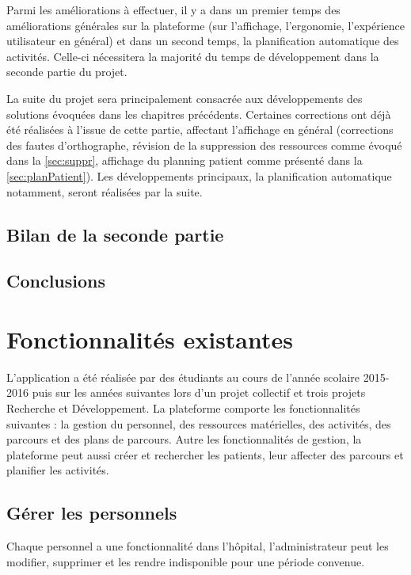 \documentclass[noposter]{polytech/polytech}
\begin{document}
Parmi les améliorations à effectuer, il y a dans un premier temps des améliorations générales sur la plateforme (sur l'affichage, l'ergonomie, l'expérience utilisateur en général) et dans un second temps, la planification automatique des activités. Celle-ci nécessitera la majorité du temps de développement dans la seconde partie du projet.

La suite du projet sera principalement consacrée aux développements des solutions évoquées dans les chapitres précédents. Certaines corrections ont déjà été réalisées à l'issue de cette partie, affectant l'affichage en général (corrections des fautes d'orthographe, révision de la suppression des ressources comme évoqué dans la \autoref{sec:suppr}, affichage du planning patient comme présenté dans la \autoref{sec:planPatient}). Les développements principaux, la planification automatique notamment, seront réalisées par la suite. 

\section*{Bilan de la seconde partie}


\section*{Conclusions}



\appendix

\chapter{Fonctionnalités existantes}
\label{ann:foncExist}

L'application a été réalisée par des étudiants au cours de l'année scolaire 2015-2016 puis sur les années suivantes lors d'un projet collectif et trois projets Recherche et Développement. La plateforme comporte les fonctionnalités suivantes : la gestion du personnel, des ressources matérielles, des activités, des parcours et des plans de parcours. Autre les fonctionnalités de gestion, la plateforme peut aussi créer et rechercher les patients, leur affecter des parcours et planifier les activités.


\section{Gérer les personnels}

Chaque personnel a une fonctionnalité dans l'hôpital, l'administrateur peut les modifier, supprimer et les rendre indisponible pour une période convenue.
\end{document}
